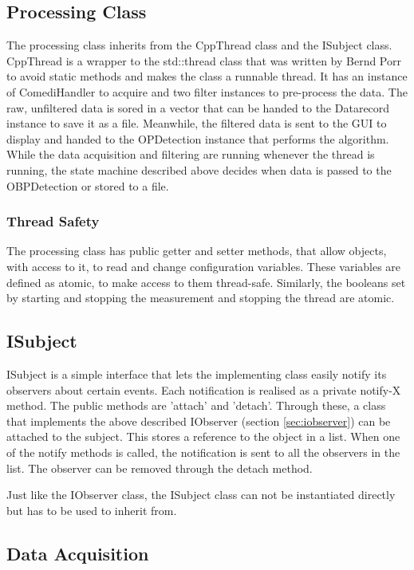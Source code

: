\subsection{Processing Class} 
The processing class inherits from the CppThread class and the ISubject class. CppThread is a wrapper to the std::thread class that was written by Bernd Porr to avoid static methods and makes the class a runnable thread. It has an instance of ComediHandler to acquire and two filter instances to pre-process the data. The raw, unfiltered data is sored in a vector that can be handed to the Datarecord instance to save it as a file. Meanwhile, the filtered data is sent to the GUI to display and handed to the OPDetection instance that performs the algorithm. While the data acquisition and filtering are running whenever the thread is running, the state machine described above decides when data is passed to the OBPDetection or stored to a file. 

\subsubsection{Thread Safety}
The processing class has public getter and setter methods, that allow objects, with access to it, to read and change configuration variables. These variables are defined as atomic, to make access to them thread-safe. Similarly, the booleans set by starting and stopping the measurement and stopping the thread are atomic.

\subsection{ISubject}
ISubject is a simple interface that lets the implementing class easily notify its observers about certain events. Each notification is realised as a private notify-X method. The public methods are 'attach' and 'detach'. Through these, a class that implements the above described IObserver (section \ref{sec:iobserver}) can be attached to the subject. This stores a reference to the object in a list. When one of the notify methods is called, the notification is sent to all the observers in the list. The observer can be removed through the detach method. 

Just like the IObserver class, the ISubject class can not be instantiated directly but has to be used to inherit from. 


\subsection{Data Acquisition}

